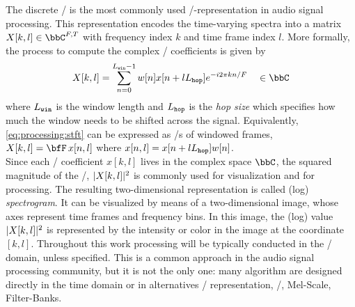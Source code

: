 \mynewline
The discrete \STFT/
is the most commonly used \TF/-representation in audio signal processing.
This representation encodes the time-varying spectra into a matrix $X[k,l] \in \bbC^{F,T}$ with frequency index $k$ and time frame index $l$.
More formally, the process to compute the complex \STFT/ coefficients is given by
\begin{equation}\label{eq:processing:stft}
    X[k, l]  = \sum_{n=0}^{\winsize-1} w[n] x[n + l \hopsize] \cste^{- \csti 2 \pi k n / F} \mathspace\in\bbC
\end{equation}
where $L_\mathtt{win}$ is the window length and $L_\mathtt{hop}$ is the \textit{hop size} which specifies how much the window needs to be shifted across the signal.
Equivalently, \cref{eq:processing:stft} can be expressed as \DFT/s of windowed frames, $X[k, l] = \discreteFT{x[n,l]}$ where $x[n,l] = x[n + l L_\mathtt{hop}] w[n]$.
\\Since each \STFT/ coefficient $x[k, l]$ lives in the complex space $\bbC$, the squared magnitude of the \STFT/, $|{X[k,l]}|^2$ is
commonly used for visualization and for processing.%
The resulting two-dimensional representation is called (log) \textit{spectrogram}.%
It can be visualized by means of a two-dimensional image, whose axes represent time frames and frequency bins.
In this image, the (log) value $|{X[k,l]}|^2$ is represented by the intensity or color in the image at the coordinate $[k,l]$.
Throughout this work processing will be typically conducted in the \STFT/ domain, unless specified.
This is a common approach in the audio signal processing community, but it is not the only one:
many algorithm are designed directly in the time domain or in alternatives \TF/ representation, \eg/, Mel-Scale, Filter-Banks.


